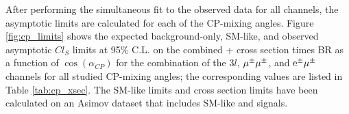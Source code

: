 After performing the simultaneous fit to the observed data for all channels, the asymptotic limits are calculated for each of the CP-mixing angles. Figure \ref{fig:cp_limits} shows the expected background-only, SM-like, and observed asymptotic $Cl_S$ limits at 95\% C.L. on the combined \tH + \ttH cross section times BR as a function of $\cos(\alpha_{CP})$ for the combination of the $3l$, $\mu^\pm\mu^\pm$, and $\textrm{e}^\pm\mu^\pm$ channels for all studied CP-mixing angles; the corresponding values are listed in Table \ref{tab:cp_xsec}. The SM-like limits and cross section limits have been calculated on an Asimov dataset that includes SM-like \tH and \ttH signals. 

